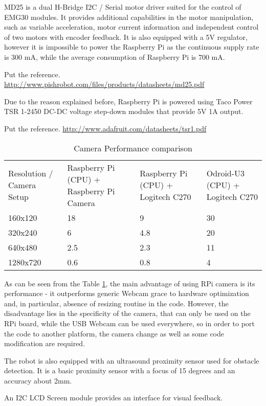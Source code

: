 MD25 is a dual H-Bridge I2C / Serial motor driver suited for the control of
EMG30 modules.
It provides additional capabilities in the motor manipulation, such as variable
acceleration, motor current information and independent control of two motors
with encoder feedback. It is also equipped with a 5V regulator, however it is
impossible to power the Raspberry Pi as the continuous supply rate is 300 mA,
while the average consumption of Raspberry Pi is 700 mA.

Put the reference.
\url{http://www.pishrobot.com/files/products/datasheets/md25.pdf}

Due to the reason explained before, Raspberry Pi is powered using Taco Power TSR
1-2450 DC-DC voltage step-down modules that provide 5V 1A output.

Put the reference.
\url{http://www.adafruit.com/datasheets/tsr1.pdf}

\begin{table}[h!]
	\setlength\extrarowheight{2pt}
	\setlength\arraycolsep{5pt}
    \begin{tabularx}{\textwidth}{XXXX}
    Resolution / Camera Setup & Raspberry Pi  (CPU) + Raspberry Pi Camera &
    Raspberry Pi (CPU) + Logitech C270 & Odroid-U3 (CPU) + Logitech C270 \\
    160x120            & 18           & 9          & 30         \\
    320x240            & 6            & 4.8        & 20         \\
    640x480            & 2.5          & 2.3        & 11         \\
    1280x720           & 0.6          & 0.8        & 4          \\
    \end{tabularx}
    \caption{Camera Performance comparison}
    \label{tab:cam_perf}
\end{table}

As can be seen from the Table \ref{tab:cam_perf}, the main advantage of using
RPi camera is its performance - it outperforms generic Webcam grace to hardware
optimization and, in particular, absence of resizing routine in the code.
However, the disadvantage lies in the specificity of the camera, that can only
be used on the RPi board, while the USB Webcam can be used everywhere, so in
order to port the code to another platform, the camera change as well as some
code modification are required.

The robot is also equipped with an ultrasound proximity sensor used for obstacle
detection. It is a basic proximity sensor with a focus of 15 degrees and an
accuracy about 2mm. 

An I2C LCD Screen module provides an interface for visual feedback.